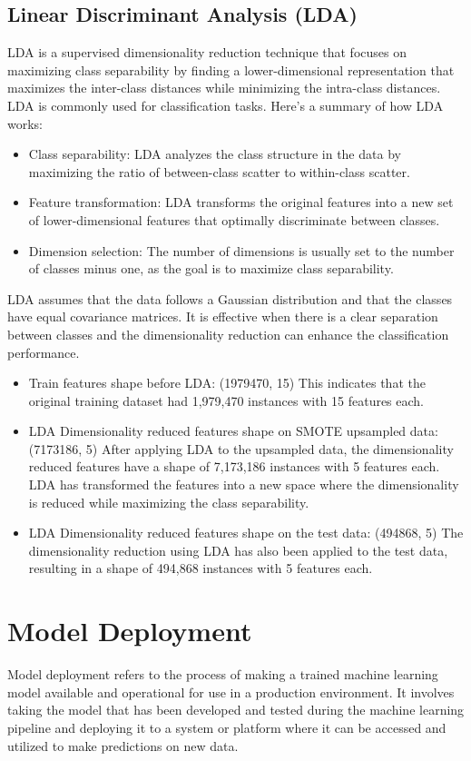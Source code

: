 \documentclass{article}
\begin{document}
\subsection{Linear Discriminant Analysis (LDA)}
LDA is a supervised dimensionality reduction technique that focuses on maximizing class separability by finding a lower-dimensional representation that maximizes the inter-class distances while minimizing the intra-class distances. LDA is commonly used for classification tasks. Here's a summary of how LDA works:
\begin{itemize}
    \item Class separability: LDA analyzes the class structure in the data by maximizing the ratio of between-class scatter to within-class scatter.
    \item Feature transformation: LDA transforms the original features into a new set of lower-dimensional features that optimally discriminate between classes.
    \item Dimension selection: The number of dimensions is usually set to the number of classes minus one, as the goal is to maximize class separability.
\end{itemize}
LDA assumes that the data follows a Gaussian distribution and that the classes have equal covariance matrices. It is effective when there is a clear separation between classes and the dimensionality reduction can enhance the classification performance.

\begin{itemize}
    \item Train features shape before LDA: (1979470, 15)
This indicates that the original training dataset had 1,979,470 instances with 15 features each.
    \item LDA Dimensionality reduced features shape on SMOTE upsampled data: (7173186, 5)
After applying LDA to the upsampled data, the dimensionality reduced features have a shape of 7,173,186 instances with 5 features each. LDA has transformed the features into a new space where the dimensionality is reduced while maximizing the class separability.
    \item LDA Dimensionality reduced features shape on the test data: (494868, 5)
The dimensionality reduction using LDA has also been applied to the test data, resulting in a shape of 494,868 instances with 5 features each.
\end{itemize}

\section{Model Deployment}
Model deployment refers to the process of making a trained machine learning model available and operational for use in a production environment. It involves taking the model that has been developed and tested during the machine learning pipeline and deploying it to a system or platform where it can be accessed and utilized to make predictions on new data.
\end{document}
